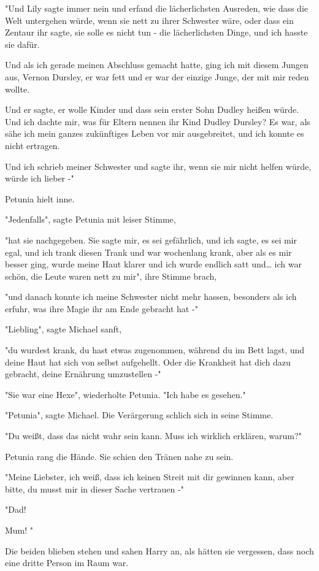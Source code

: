 {"Und Lily sagte immer nein und erfand die lächerlichsten Ausreden, wie dass die Welt untergehen würde, wenn sie nett zu ihrer Schwester wäre, oder dass ein Zentaur ihr sagte, sie solle es nicht tun - die lächerlichsten Dinge, und ich hasste sie dafür.

Und als ich gerade meinen Abschluss gemacht hatte, ging ich mit diesem Jungen aus, Vernon Dursley, er war fett und er war der einzige Junge, der mit mir reden wollte.

Und er sagte, er wolle Kinder und dass sein erster Sohn Dudley heißen würde. Und ich dachte mir, was für Eltern nennen ihr Kind Dudley Dursley? Es war, als sähe ich mein ganzes zukünftiges Leben vor mir ausgebreitet, und ich konnte es nicht ertragen.

Und ich schrieb meiner Schwester und sagte ihr, wenn sie mir nicht helfen würde, würde ich lieber -"

Petunia hielt inne.

"Jedenfalls", sagte Petunia mit leiser Stimme,

"hat sie nachgegeben. Sie sagte mir, es sei gefährlich, und ich sagte, es sei mir egal, und ich trank diesen Trank und war wochenlang krank, aber als es mir besser ging, wurde meine Haut klarer und ich wurde endlich satt und… ich war schön, die Leute waren nett zu mir", ihre Stimme brach,

"und danach konnte ich meine Schwester nicht mehr hassen, besonders als ich erfuhr, was ihre Magie ihr am Ende gebracht hat -"

"Liebling", sagte Michael sanft,

"du wurdest krank, du hast etwas zugenommen, während du im Bett lagst, und deine Haut hat sich von selbst aufgehellt. Oder die Krankheit hat dich dazu gebracht, deine Ernährung umzustellen -"

"Sie war eine Hexe", wiederholte Petunia. "Ich habe es gesehen."

"Petunia", sagte Michael. Die Verärgerung schlich sich in seine Stimme.

"Du weißt, dass das nicht wahr sein kann. Muss ich wirklich erklären, warum?"

Petunia rang die Hände. Sie schien den Tränen nahe zu sein.

"Meine Liebster, ich weiß, dass ich keinen Streit mit dir gewinnen kann, aber bitte, du musst mir in dieser Sache vertrauen -"

"Dad!

Mum! "

Die beiden blieben stehen und sahen Harry an, als hätten sie vergessen, dass noch eine dritte Person im Raum war.

}
